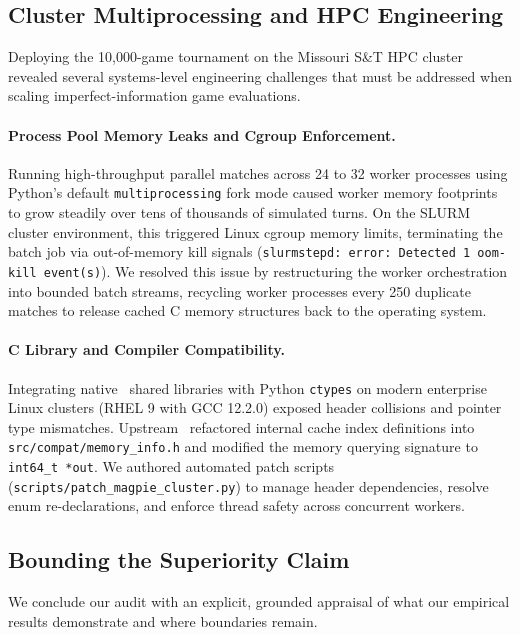 \subsection{Cluster Multiprocessing and HPC Engineering}

Deploying the 10,000-game tournament on the Missouri S\&T HPC cluster revealed several systems-level engineering challenges that must be addressed when scaling imperfect-information game evaluations.

\paragraph{Process Pool Memory Leaks and Cgroup Enforcement.} Running high-throughput parallel matches across 24 to 32 worker processes using Python's default \texttt{multiprocessing} fork mode caused worker memory footprints to grow steadily over tens of thousands of simulated turns. On the SLURM cluster environment, this triggered Linux cgroup memory limits, terminating the batch job via out-of-memory kill signals (\texttt{slurmstepd: error: Detected 1 oom-kill event(s)}). We resolved this issue by restructuring the worker orchestration into bounded batch streams, recycling worker processes every 250 duplicate matches to release cached C memory structures back to the operating system.

\paragraph{C Library and Compiler Compatibility.} Integrating native \magpie\ shared libraries with Python \texttt{ctypes} on modern enterprise Linux clusters (RHEL 9 with GCC 12.2.0) exposed header collisions and pointer type mismatches. Upstream \magpie\ refactored internal cache index definitions into \texttt{src/compat/memory\_info.h} and modified the memory querying signature to \texttt{int64\_t *out}. We authored automated patch scripts (\texttt{scripts/patch\_magpie\_cluster.py}) to manage header dependencies, resolve enum re-declarations, and enforce thread safety across concurrent workers.

\subsection{Bounding the Superiority Claim}

We conclude our audit with an explicit, grounded appraisal of what our empirical results demonstrate and where boundaries remain.

